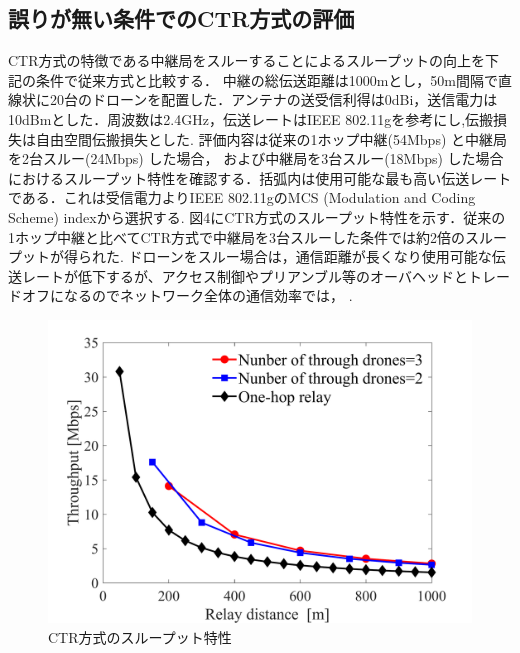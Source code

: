 \documentclass[a4paper,10pt]{ltjsarticle}
\begin{document}
\subsection{誤りが無い条件でのCTR方式の評価}
CTR方式の特徴である中継局をスルーすることによるスループットの向上を下記の条件で従来方式と比較する．%
中継の総伝送距離は1000mとし，50m間隔で直線状に20台のドローンを配置した．アンテナの送受信利得は0dBi，送信電力は10dBmとした．周波数は2.4GHz，伝送レートはIEEE 802.11gを参考にし,伝搬損失は自由空間伝搬損失とした.
評価内容は従来の1ホップ中継(54Mbps) と中継局を2台スルー(24Mbps) した場合，
および中継局を3台スルー(18Mbps) した場合におけるスループット特性を確認する．括弧内は使用可能な最も高い伝送レートである．これは受信電力よりIEEE 802.11gのMCS (Modulation and Coding Scheme) indexから選択する.
図4にCTR方式のスループット特性を示す．従来の1ホップ中継と比べてCTR方式で中継局を3台スルーした条件では約2倍のスループットが得られた.
ドローンをスルー場合は，通信距離が長くなり使用可能な伝送レートが低下するが、アクセス制御やプリアンブル等のオーバヘッドとトレードオフになるのでネットワーク全体の通信効率では，
.
\begin{figure}[H]
  \centering
  \includegraphics[width=\linewidth]{throughtput_vs_placement_50m_max_distance_3.pdf} %
  \caption{CTR方式のスループット特性}
  \label{fig:throughput_through} %
\end{figure}
\end{document}
